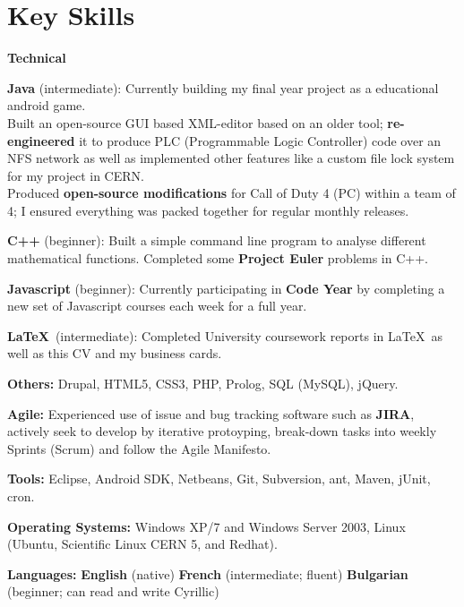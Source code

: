 \documentclass[final,a4paper,notitlepage,10pt]{report}
\begin{document}
\section*{Key Skills {\hfill\raisebox{.5ex}{\makebox[.65\textwidth]{\hrulefill}}}}
{\bf Technical}
\vspace*{-0.5\baselineskip}
\begin{compactitemize}
	\item \textbf{Java} (intermediate): Currently building my final year project as a educational android game.\\
	Built an open-source GUI based XML-editor based on an older tool; \textbf{re-engineered} it to produce PLC (Programmable Logic Controller) code over an NFS network as well as implemented other features like a custom file lock system for my project in CERN.\\
	Produced \textbf{open-source modifications} for Call of Duty 4 (PC) within a team of 4; I ensured everything was packed together for regular monthly releases.
	\item \textbf{C++} (beginner): Built a simple command line program to analyse different mathematical functions. Completed some \textbf{Project Euler} problems in C++.
	\item \textbf{Javascript} (beginner): Currently participating in \textbf{Code Year} by completing a new set of Javascript courses each week for a full year.
	\item \textbf{\LaTeX}\ (intermediate): Completed University coursework reports in \LaTeX\ as well as this CV and my business cards.
	\item \textbf{Others:} Drupal, HTML5, CSS3, PHP, Prolog, SQL (MySQL), jQuery.
	\item \textbf{Agile:} Experienced use of issue and bug tracking software such as \textbf{JIRA}, actively seek to develop by iterative protoyping, break-down tasks into weekly Sprints (Scrum) and follow the Agile Manifesto.
	\item \textbf{Tools:} Eclipse, Android SDK, Netbeans, Git, Subversion, ant, Maven, jUnit, cron.
	\item \textbf{Operating Systems:} Windows XP/7 and Windows Server 2003, Linux (Ubuntu, Scientific Linux CERN 5, and Redhat).
\end{compactitemize}

{\bf Languages:} \qquad \textbf{English} (native) \quad \textbf{French} (intermediate; fluent) \quad \textbf{Bulgarian} (beginner; can read and write Cyrillic)
\end{document}
